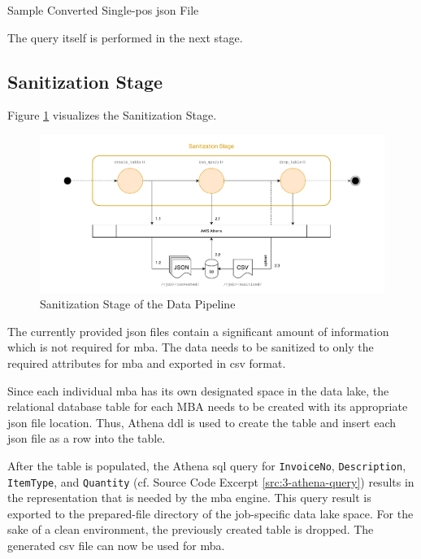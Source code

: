 \begin{longlisting}
	\inputminted{json}{main-matter/src/3-json.json}
	\caption{Sample Converted Single-\acs{pos} \acs{json} File}
	\label{src:3-json}
\end{longlisting}

The query itself is performed in the next stage.

\subsection{Sanitization Stage}
Figure \ref{fig:3-sanitize} visualizes the Sanitization Stage.

\begin{figure}[h!]
	\includegraphics[width=\linewidth]{main-matter/img/3-3-3-sanitize}
	\caption{Sanitization Stage of the Data Pipeline}
	\label{fig:3-sanitize}	
\end{figure}

The currently provided \ac{json} files contain a significant amount of information which is not required for \ac{mba}. The data needs to be sanitized to only the required attributes for \ac{mba} and exported in \ac{csv} format.

Since each individual \ac{mba} has its own designated space in the data lake, the relational database table for each MBA needs to be created with its appropriate \ac{json} file location. Thus, Athena \ac{ddl} is used to create the table and insert each \ac{json} file as a row into the table.

After the table is populated, the Athena \ac{sql} query for \texttt{InvoiceNo}, \texttt{Description}, \texttt{ItemType}, and \texttt{Quantity} (cf. Source Code Excerpt \ref{src:3-athena-query}) results in the representation that is needed by the \ac{mba} engine. This query result is exported to the prepared-file directory of the job-specific data lake space. For the sake of a clean environment, the previously created table is dropped. The generated \ac{csv} file can now be used for \ac{mba}.

